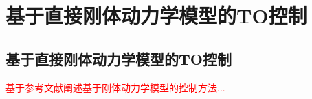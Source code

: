 
\chapter[基于直接刚体动力学模型的TO控制]{基于直接刚体动力学模型的TO控制}
\section[基于直接刚体动力学模型的TO控制]{基于直接刚体动力学模型的TO控制\cite[p2-6]{Dario_Bellicoso_Gehring_Hwangbo_Fankhauser_Hutter_2016,Pardo_Neunert_Winkler_Grandia_Buchli_2017}}
\textcolor{red}{\small
基于参考文献阐述基于刚体动力学模型的控制方法...
}